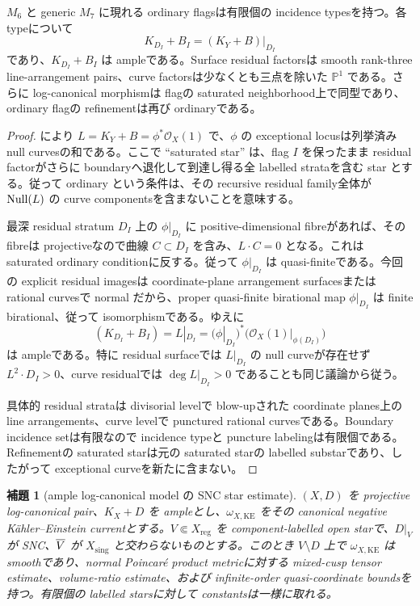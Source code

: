 \documentclass[11pt,a4paper]{ltjsarticle}
\newcommand{\PP}{\mathbb P}\newcommand{\RR}{\mathbb R}\newcommand{\CC}{\mathbb C}
\theoremstyle{plain}
\newtheorem{lemma}[theorem]{補題}\newtheorem{corollary}[theorem]{系}
\theoremstyle{definition}
\theoremstyle{remark}
\begin{document}
\begin{proposition}\label{prop:ordinary-residual-ample}
$M_6$ と generic $M_7$ に現れる ordinary flagsは有限個の incidence typesを持つ。各 typeについて
\[
 K_{D_I}+B_I=(K_Y+B)|_{D_I}
\]
であり、$K_{D_I}+B_I$ は ampleである。Surface residual factorsは smooth rank-three line-arrangement pairs、curve factorsは少なくとも三点を除いた $\PP^1$ である。さらに log-canonical morphismは flagの saturated neighborhood上で同型であり、ordinary flagの refinementは再び ordinaryである。
\end{proposition}

\begin{proof}
 により $L=K_Y+B=\phi^*\mathcal O_X(1)$ で、$\phi$ の exceptional locusは列挙済み null curvesの和である。ここで ``saturated star'' は、flag $I$ を保ったまま residual factorがさらに boundaryへ退化して到達し得る全 labelled strataを含む star とする。従って ordinary という条件は、その recursive residual family全体が $\operatorname{Null}(L)$ の curve componentsを含まないことを意味する。

最深 residual stratum $D_I$ 上の $\phi|_{D_I}$ に positive-dimensional fibreがあれば、その fibreは projectiveなので曲線 $C\subset D_I$ を含み、$L\cdot C=0$ となる。これは saturated ordinary conditionに反する。従って $\phi|_{D_I}$ は quasi-finiteである。今回の explicit residual imagesは coordinate-plane arrangement surfacesまたは rational curvesで normal だから、proper quasi-finite birational map $\phi|_{D_I}$ は finite birational、従って isomorphismである。ゆえに
\[
 (K_{D_I}+B_I)=L|_{D_I}
 = (\phi|_{D_I})^*\bigl(\mathcal O_X(1)|_{\phi(D_I)}\bigr)
\]
は ampleである。特に residual surfaceでは $L|_{D_I}$ の null curveが存在せず $L^2\cdot D_I>0$、curve residualでは $\deg L|_{D_I}>0$ であることも同じ議論から従う。

具体的 residual strataは divisorial levelで blow-upされた coordinate planes上の line arrangements、curve levelで punctured rational curvesである。Boundary incidence setは有限なので incidence typeと puncture labelingは有限個である。Refinementの saturated starは元の saturated starの labelled substarであり、したがって exceptional curveを新たに含まない。
\end{proof}

\begin{lemma}[ample log-canonical model の SNC star estimate]\label{lem:ample-snc-star}
$(X,D)$ を projective log-canonical pair、$K_X+D$ を ampleとし、$\omega_{X,\mathrm{KE}}$ をその canonical negative K\"ahler--Einstein currentとする。$V\Subset X_{\mathrm{reg}}$ を component-labelled open starで、$D|_V$ が SNC、$\overline V$ が $X_{\mathrm{sing}}$ と交わらないものとする。このとき $V\setminus D$ 上で $\omega_{X,\mathrm{KE}}$ は smoothであり、normal Poincar\'e product metricに対する mixed-cusp tensor estimate、volume-ratio estimate、および infinite-order quasi-coordinate boundsを持つ。有限個の labelled starsに対して constantsは一様に取れる。
\end{lemma}
\end{document}
